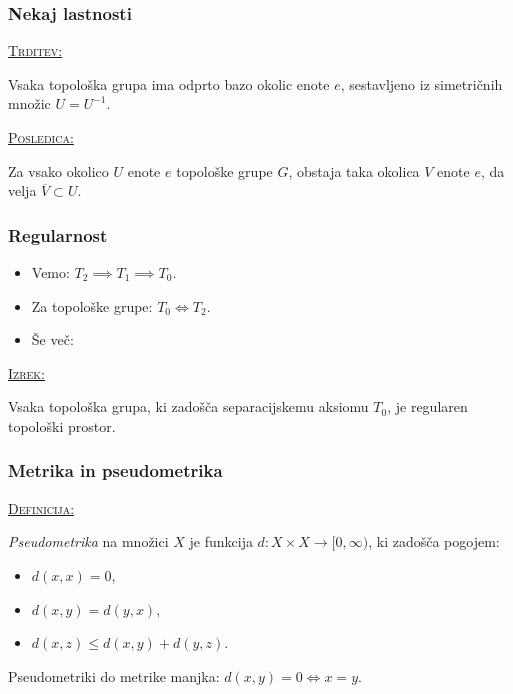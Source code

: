 \documentclass[a4paper, 12pt]{beamer}
\newenvironment{matematika}[1]{
\textcolor{bostonuniversityred}{\underline{\textsc{#1:}}}
}{
}
\begin{document}
\begin{frame}
\frametitle{Nekaj lastnosti}
\begin{matematika}{Trditev}
Vsaka topološka grupa ima odprto bazo okolic enote $e$, sestavljeno iz simetričnih množic $U = U^{-1}$.
\end{matematika} \newline

\begin{matematika}{Posledica}
Za vsako okolico $U$ enote $e$ topološke grupe $G$, obstaja taka okolica $V$ enote $e$, da velja $\overline{V} \subset U$.
\end{matematika}
\end{frame}

\begin{frame}
\frametitle{Regularnost}
\begin{itemize}[label=]
\item Vemo: $T_2 \implies T_1 \implies T_0$.
\item Za topološke grupe: $T_0 \iff T_2$. \pause
\item Še več:
\end{itemize}

\begin{matematika}{Izrek}
Vsaka topološka grupa, ki zadošča separacijskemu aksiomu $T_0$, je regularen topološki prostor.
\end{matematika}
\end{frame}

\begin{frame}
\frametitle{Metrika in pseudometrika}
\begin{matematika}{Definicija}
	\emph{Pseudometrika} na množici $X$ je funkcija $d: X \times X \to [0,\infty)$, ki zadošča pogojem:
	\begin{itemize}[label=]
		\item $d(x, x) = 0$,
		\item $d(x, y) = d(y, x)$,
		\item $d(x, z) \leq d(x, y) + d(y, z)$.
	\end{itemize}
\end{matematika}
\vspace{12pt}
Pseudometriki do metrike manjka: $d(x, y) = 0 \iff x = y$.
\end{frame}
\end{document}
